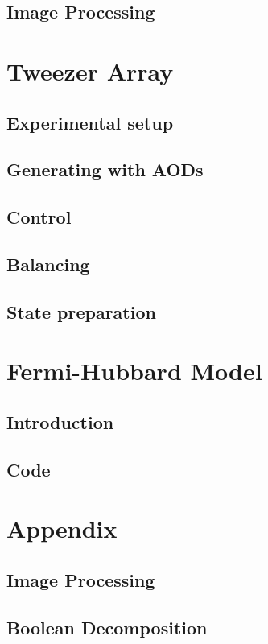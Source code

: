 \documentclass[twoside]{article}
\begin{document}
\subsection{Image Processing}




\section{Tweezer Array}

\subsection{Experimental setup}


\subsection{Generating with AODs}


\subsection{Control}


\subsection{Balancing}


\subsection{State preparation}




\section{Fermi-Hubbard Model}

\subsection{Introduction}


\subsection{Code}



\section{Appendix}

% 

\subsection{Image Processing}


\subsection{Boolean Decomposition}




\end{document}
